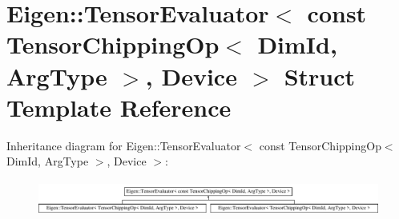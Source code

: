 \hypertarget{struct_eigen_1_1_tensor_evaluator_3_01const_01_tensor_chipping_op_3_01_dim_id_00_01_arg_type_01_4_00_01_device_01_4}{}\section{Eigen\+:\+:Tensor\+Evaluator$<$ const Tensor\+Chipping\+Op$<$ Dim\+Id, Arg\+Type $>$, Device $>$ Struct Template Reference}
\label{struct_eigen_1_1_tensor_evaluator_3_01const_01_tensor_chipping_op_3_01_dim_id_00_01_arg_type_01_4_00_01_device_01_4}
Inheritance diagram for Eigen\+:\+:Tensor\+Evaluator$<$ const Tensor\+Chipping\+Op$<$ Dim\+Id, Arg\+Type $>$, Device $>$\+:\begin{figure}[H]
\begin{center}
\leavevmode
\includegraphics[height=1.171548cm]{struct_eigen_1_1_tensor_evaluator_3_01const_01_tensor_chipping_op_3_01_dim_id_00_01_arg_type_01_4_00_01_device_01_4}
\end{center}
\end{figure}
